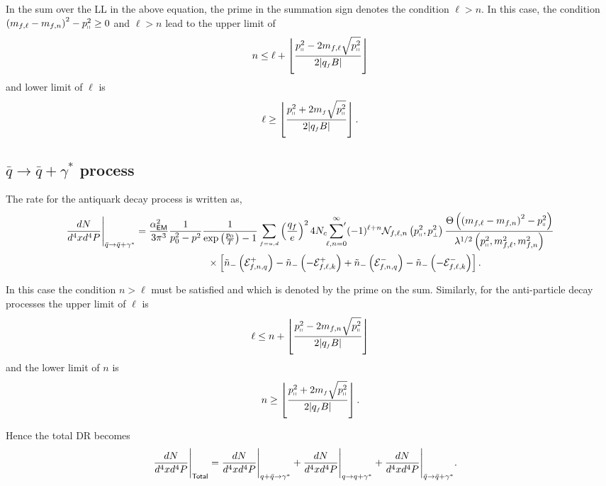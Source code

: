 \documentclass[aps,prd,floatfix,showpacs,showkeys,superscriptadress,unsortedaddress,nofootinbib,onecolumn]{revtex4-1}
\newcommand{\sF}{\scriptscriptstyle{f}}
\newcommand{\sperp}{\scriptscriptstyle{\perp}}
\newcommand{\shp}{\shortparallel}
\newcommand{\nn}{\nonumber \\}
\begin{document}
In the sum over the LL in the above equation,  the prime in the summation sign denotes the condition $\ell >n$. In this case,  the condition $\left(m_{f,\ell}-m_{f,n}\right)^2-p_{\shp}^2 \geq 0$ and $\ell > n$ lead to the upper limit of 
\begin{align}
n\leq \ell +\left\lfloor\frac{p_{\shp}^2-2m_{f,\ell}\sqrt{p_{\shp}^2}}{2|q_{\sF}B|}\right\rfloor 
\end{align}
and lower limit of $\ell$ is
\begin{align}
\ell \geq \left\lfloor\frac{p_{\shp}^2+2m_{\sF}\sqrt{p_{\shp}^2}}{2|q_{\sF}B|}\right\rfloor .
\end{align}
\subsection{$\bar{q}\rightarrow \bar{q}+\gamma^*$ process}

The rate for the antiquark decay process is written as,
\begin{align}
& \frac{dN}{d^4xd^4P}\Bigg\vert_{\bar{q}\rightarrow \bar{q}+\gamma^*} =\frac{\alpha_{\textsf{EM}}^2}{3\pi^3}\frac{1}{p_0^2-p^2}\frac{1}{\exp\left(\frac{p_0}{T}\right)-1}\sum_{\sF=u,d}\left(\frac{q_{f}}{e}\right)^24N_c\sideset{}{'}\sum_{\ell,n=0}^{\infty}(-1)^{\ell+n}\mathcal{N}_{f,\ell,n}\left(p^2_{\shp},p_{\sperp}^2\right)\frac{\Theta\left(\left(m_{f,\ell}-m_{f,n}\right)^2-p_{\shp}^2\right)}{\lambda^{1/2}\left(p_{\shp}^2,m^2_{f,\ell},m^2_{f,n}\right)}\nn
&\hspace{5cm}\times\left[\tilde{n}_{-}\left(\mathcal{E}^{+}_{f,n,q}\right)-\tilde{n}_{-}\left(-\mathcal{E}^{+}_{f,\ell,k}\right)+\tilde{n}_{-}\left(\mathcal{E}^{-}_{f,n,q}\right)-\tilde{n}_{-}\left(-\mathcal{E}^{-}_{f,\ell,k}\right)\right].
\end{align}

In this case the condition $n>\ell$ must be satisfied and which is denoted by the prime on the sum. Similarly, for the anti-particle decay processes the upper limit of $\ell$ is 
\begin{align}
\ell\leq n + \left\lfloor\frac{p_{\shp}^2-2m_{f,n}\sqrt{p_{\shp}^2}}{2|q_{\sF}B|}\right\rfloor 
\end{align}
and the lower limit of $n$ is
\begin{align}
n \geq \left\lfloor\frac{p_{\shp}^2+2m_{\sF}\sqrt{p_{\shp}^2}}{2|q_{\sF}B|}\right\rfloor.
\end{align}

Hence the total DR becomes 
\begin{align}
& \frac{dN}{d^4xd^4P}\Bigg\vert_{\sf{Total}} =\frac{dN}{d^4xd^4P}\Bigg\vert_{q+\bar{q}\rightarrow \gamma^*} + \frac{dN}{d^4xd^4P}\Bigg\vert_{q\rightarrow q+\gamma^*} +\frac{dN}{d^4xd^4P}\Bigg\vert_{\bar{q}\rightarrow \bar{q}+\gamma^*}.
\label{eq:DR_total}
\end{align}
\end{document}
